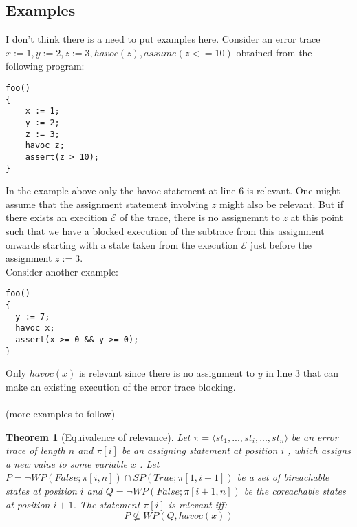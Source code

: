 \documentclass{article}
\newtheorem{theorem}{Theorem}
\begin{document}
\newpage
\subsection{Examples}
I don't think there is a need to put examples here.
Consider an error trace $x:=1, y:=2, z:=3, havoc(z), assume(z <=10)$ obtained from the following program:
\begin{lstlisting}
foo()
{
	x := 1;
	y := 2;
	z := 3;
	havoc z;
	assert(z > 10);
}
\end{lstlisting}
In the example above only the havoc statement at line 6 is relevant. One might assume that the assignment statement involving $z$ might also be relevant. But if there exists an execition $\mathcal{E}$ of the trace, there is no assignemnt to $z$ at this point such that we have a blocked execution of the subtrace from this assignment onwards starting with a state taken from the execution $\mathcal{E}$ just before the assignment $z:=3$. \\
Consider another example:
\begin{lstlisting}
foo()
{
  y := 7;
  havoc x;
  assert(x >= 0 && y >= 0);
}
\end{lstlisting}
Only $havoc(x)$ is relevant since there is no assignment to $y$ in line 3 that can make an existing execution of the error trace blocking.\\
\\
(more examples to follow)
\newpage
\begin{theorem}[Equivalence of relevance]\label{mydef:relevancytheorem}
Let $\pi = \langle st_1,...,st_i,...,st_n \rangle$ be an error trace of length $n$ and $\pi[i]$ be an assigning statement at position $i$ , which assigns a new value to some variable $x$ . Let $P = \neg WP(False; \pi[i,n]) \cap SP(True; \pi[1,i-1])$ be a set of bireachable states at position $i$ and $Q =  \neg WP(False; \pi[i+1,n])$ be the coreachable states at position $i+1$. The statement $\pi[i]$ is relevant iff:
 $$P \not \subseteq WP(Q,havoc(x))$$
\end{theorem}
\end{document}
